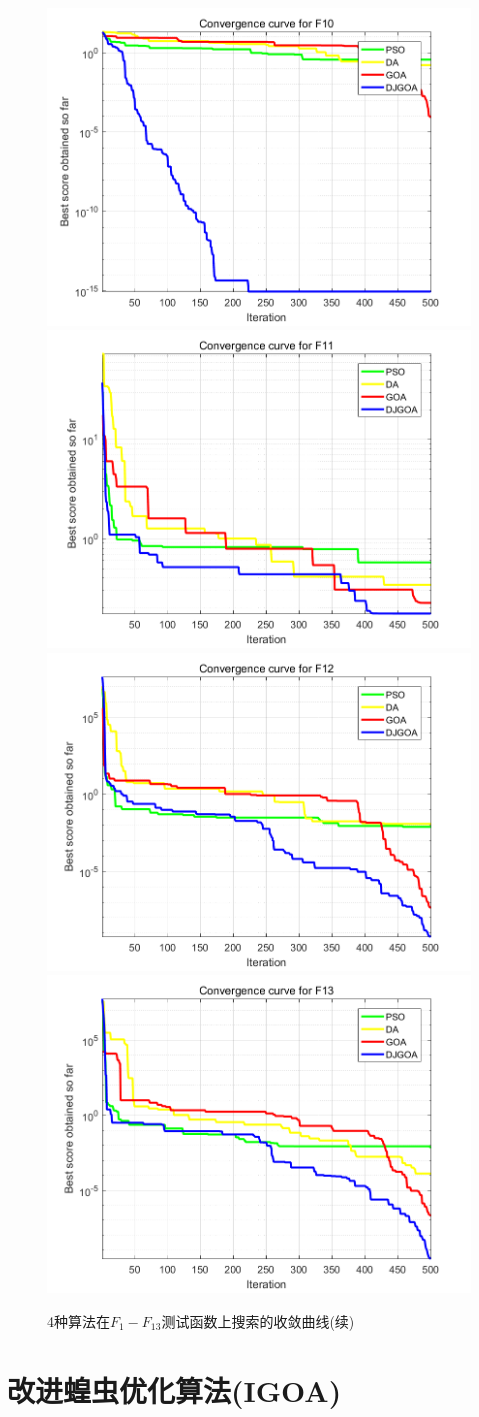 \begin{figure}[!htbp]
    \includegraphics[width=.5\linewidth]{DJGOA_F10}\hfill\\[0.5cm]
    \centering
    \includegraphics[width=.5\linewidth]{DJGOA_F11}\hfill
    \includegraphics[width=.5\linewidth]{DJGOA_F12}\hfill\\[0.5cm]
    \centering
    \includegraphics[width=.5\linewidth]{DJGOA_F13}\hfill\\[0.5cm]
    \caption{4种算法在$F_{1}-F_{13}$测试函数上搜索的收敛曲线(续)}
\end{figure}

\section{改进蝗虫优化算法(IGOA)}\label{sec:task_scheduling_IGOA}

